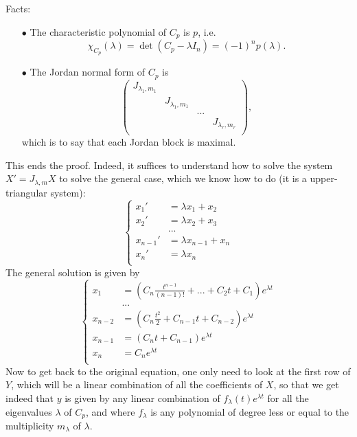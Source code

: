 \begin{itemize}
Facts:
\begin{itemize}
\item[$\bullet$] The characteristic polynomial of $C_p$ is $p$, i.e.
\[\chi_{C_p}(\lambda) = \det (C_p -\lambda I_n ) =  (-1)^n p(\lambda).\]
\item[$\bullet$] The Jordan normal form of $C_p$ is 
\[ \begin{pmatrix}   
J_{\lambda_1,m_1} & & & \\
                  & J_{\lambda_1,m_1} & & \\
                  &                   & ... & \\
                  &                   &     & J_{\lambda_r,m_r} \\
\end{pmatrix},\]
which is to say that each Jordan block is maximal. 
\end{itemize}

This ends the proof. Indeed, it suffices to understand how to solve the system $X' = J_{\lambda,m}X$ to solve the general case, which we know how to do (it is a upper-triangular system):
\[\left\{\begin{split} 
x_1' & = \lambda x_1 + x_2 \\
x_2' & = \lambda x_2 + x_3 \\
     & ...                  \\
x_{n-1}' & = \lambda x_{n-1} + x_n \\
x_n' & = \lambda x_n \\
\end{split}\right.\]
The general solution is given by 
\[\left\{\begin{split} 
x_{1} & = (C_n \frac{t^{n-1}}{(n-1)!} + ... + C_{2}t +C_{1}) e^{\lambda t} \\
     & ...                  \\
x_{n-2} & = (C_n \frac{t^2}{2} + C_{n-1}t +C_{n-2}) e^{\lambda t} \\
x_{n-1} & = (C_n t + C_{n-1}) e^{\lambda t} \\
x_n & = C_n e^{\lambda t} \\
\end{split}\right.\]
Now to get back to the original equation, one only need to look at the first row of $Y$, which will be a linear combination of all the coefficients of $X$, so that we get indeed that $y$ is given by any linear combination of $f_\lambda(t)e^{\lambda t}$ for all the eigenvalues $\lambda$ of $C_{p}$, and where $f_\lambda$ is any polynomial of degree less or equal to the multiplicity $m_\lambda$ of $\lambda$.


\end{itemize}
